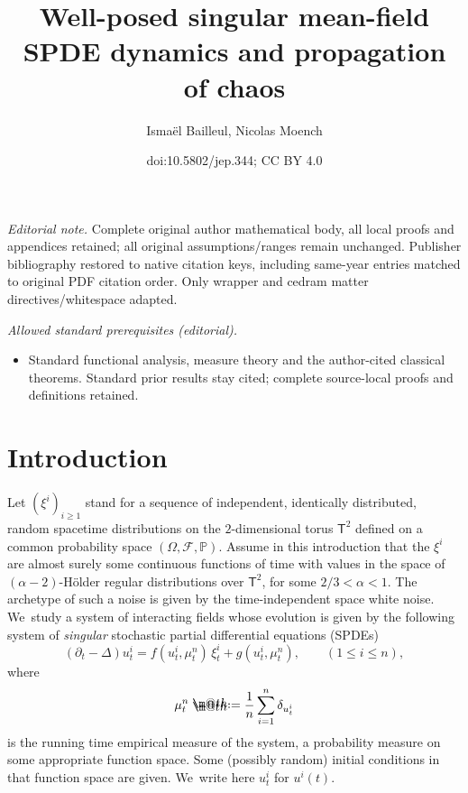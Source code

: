\documentclass[10pt]{amsart}
\title{Well-posed singular mean-field SPDE dynamics and propagation of chaos}
\author{Ismaël Bailleul, Nicolas Moench}
\date{doi:10.5802/jep.344; CC BY 4.0}
\makeatletter
\theoremstyle{definition}
\newcommand{\bsfT}{\mathbf{\mathsf{T}}}
\newcommand{\mcF}{\mathcal{F}}
\newcommand*{\defeq}{\mathrel{\rlap{%
\raisebox{0.3ex}{$\m@th\cdot$}}%
\raisebox{-0.3ex}{$\m@th\cdot$}}%
=}
\makeatother
\begin{document}
\maketitle
\noindent\textit{Editorial note.} Complete original author mathematical body, all local proofs and appendices retained; all original assumptions/ranges remain unchanged. Publisher bibliography restored to native citation keys, including same-year entries matched to original PDF citation order. Only wrapper and cedram matter directives/whitespace adapted.\par\medskip
\noindent\textit{Allowed standard prerequisites (editorial).}\begin{itemize}
\item Standard functional analysis, measure theory and the author-cited classical theorems. Standard prior results stay cited; complete source-local proofs and definitions retained.
\end{itemize}\medskip
\vspace*{-\baselineskip}
\tableofcontents


\section{Introduction}
\label{SectionIntro}

Let $(\xi^i)_{i\geq 1}$ stand for a sequence of independent, identically distributed, random spacetime distributions on the $2$-dimensional torus $\bsfT^2$ defined on a common probability space $(\Omega, \mcF, \mathbb{P})$. Assume in this introduction that the $\xi^i$ are almost surely some continuous functions of time with values in the space of $(\alpha-2)$-Hölder regular distributions over $\bsfT^2$, for some $2/3<\alpha<1$. The archetype of such a noise is given by the time-independent space white noise. We~study a system of interacting fields whose evolution is given by the following system of {\it singular} stochastic partial differential equations (SPDEs)\vspace*{-3pt}
\begin{equation} \label{EqMainSystem}
(\partial_t-\Delta)u^i_t = f(u^i_t,\mu_t^n)\,\xi_t^i + g(u^i_t,\mu_t^n), \qquad (1\leq i\leq n),
\end{equation}
where\vspace*{-6pt}\enlargethispage{\baselineskip}
\[
\mu_t^n \defeq \frac{1}{n}\sum_{i=1}^n\delta_{u^i_t}
\]
is the running time empirical measure of the system, a probability measure on some appropriate function space. Some (possibly random) initial conditions in that function space are given. We~write here $u_t^i$ for $u^i(t)$.
\end{document}
